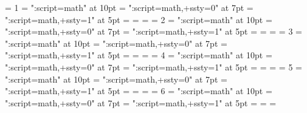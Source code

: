 \ifdefined\mathalphafontname
  \chardef\alphafam = 1 %
  \font   \tenalpha = "\mathalphafontname:script=math" at 10pt
  \font \sevenalpha = "\mathalphafontname:script=math,+ssty=0" at 7pt
  \font  \fivealpha = "\mathalphafontname:script=math,+ssty=1" at 5pt
  \textfont         \alphafam   =   \tenalpha
  \scriptfont       \alphafam   = \sevenalpha
  \scriptscriptfont \alphafam   =  \fivealpha
\else \let\alphafam=\unimathfam \fi
\ifdefined\mathdelimiterfontname
  \chardef\delimiterfam = 2
  \font   \tendelimiter = "\mathdelimiterfontname:script=math" at 10pt
  \font \sevendelimiter = "\mathdelimiterfontname:script=math,+ssty=0" at 7pt
  \font  \fivedelimiter = "\mathdelimiterfontname:script=math,+ssty=1" at 5pt
  \textfont         \delimiterfam   =   \tendelimiter
  \scriptfont       \delimiterfam   = \sevendelimiter
  \scriptscriptfont \delimiterfam   =  \fivedelimiter
\else \let\delimiterfam=\unimathfam \fi
\ifdefined\mathordfontname
  \chardef\ordfam = 3
  \font   \tenord = "\mathordfontname:script=math" at 10pt
  \font \sevenord = "\mathordfontname:script=math,+ssty=0" at 7pt
  \font  \fiveord = "\mathordfontname:script=math,+ssty=1" at 5pt
  \textfont         \ordfam   =   \tenord
  \scriptfont       \ordfam   = \sevenord
  \scriptscriptfont \ordfam   =  \fiveord
\else \let\ordfam=\unimathfam \fi
\ifdefined\mathopfontname
  \chardef\opfam = 4
  \font   \tenop = "\mathopfontname:script=math" at 10pt
  \font \sevenop = "\mathopfontname:script=math,+ssty=0" at 7pt
  \font  \fiveop = "\mathopfontname:script=math,+ssty=1" at 5pt
  \textfont         \opfam   =   \tenop
  \scriptfont       \opfam   = \sevenop
  \scriptscriptfont \opfam   =  \fiveop
\else \let\opfam=\unimathfam \fi
\ifdefined\mathbinfontname
  \chardef\binfam = 5
  \font   \tenbin = "\mathbinfontname:script=math" at 10pt
  \font \sevenbin = "\mathbinfontname:script=math,+ssty=0" at 7pt
  \font  \fivebin = "\mathbinfontname:script=math,+ssty=1" at 5pt
  \textfont         \binfam   =   \tenbin
  \scriptfont       \binfam   = \sevenbin
  \scriptscriptfont \binfam   =  \fivebin
\else \let\binfam=\unimathfam \fi
\ifdefined\mathaccentfontname
  \chardef\accentfam = 6
  \font   \tenaccent = "\mathaccentfontname:script=math" at 10pt
  \font \sevenaccent = "\mathaccentfontname:script=math,+ssty=0" at 7pt
  \font  \fiveaccent = "\mathaccentfontname:script=math,+ssty=1" at 5pt
  \textfont         \accentfam   =   \tenaccent
  \scriptfont       \accentfam   = \sevenaccent
  \scriptscriptfont \accentfam   =  \fiveaccent
\else \let\accentfam=\unimathfam \fi

